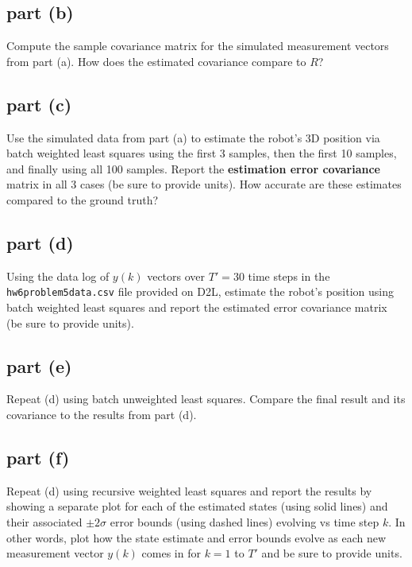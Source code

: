 \documentclass[11pt]{article}
\begin{document}
\subsection*{part (b)}
Compute the sample covariance matrix for the simulated measurement vectors from part (a). How does the estimated covariance compare to $R$?

\subsection*{part (c)}
Use the simulated data from part (a) to estimate the robot's 3D position via batch weighted least squares using the first 3 samples, then the first 10 samples, and finally using all 100 samples. Report the \textbf{estimation error covariance} matrix in all 3 cases (be sure to provide units). How accurate are these estimates compared to the ground truth?

\subsection*{part (d)}
Using the data log of $y(k)$ vectors over $T'=30$ time steps in the \texttt{hw6problem5data.csv} file provided on D2L, estimate the robot's position using batch weighted least squares and report the estimated error covariance matrix (be sure to provide units).

\subsection*{part (e)}
Repeat (d) using batch unweighted least squares. Compare the final result and its covariance to the results from part (d).

\subsection*{part (f)}
Repeat (d) using recursive weighted least squares and report the results by showing a separate plot for each of the estimated states (using solid lines) and their associated $\pm2\sigma$ error bounds (using dashed lines) evolving vs time step $k$. In other words, plot how the state estimate and error bounds evolve as each new measurement vector $y(k)$ comes in for $k=1$ to $T'$ and be sure to provide units.
\end{document}
